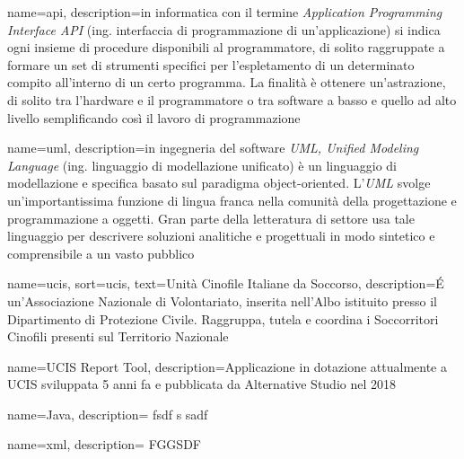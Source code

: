 \makeglossaries
\renewcommand{\acronymname}{Acronimi e abbreviazioni}

\renewcommand{\glossaryname}{Glossario}

{
    name=api,
    description={in informatica con il termine \emph{Application Programming Interface API} (ing. interfaccia di programmazione di un'applicazione) si indica ogni insieme di procedure disponibili al programmatore, di solito raggruppate a formare un set di strumenti specifici per l'espletamento di un determinato compito all'interno di un certo programma. La finalità è ottenere un'astrazione, di solito tra l'hardware e il programmatore o tra software a basso e quello ad alto livello semplificando così il lavoro di programmazione}
}

{
    name=uml,
    description={in ingegneria del software \emph{UML, Unified Modeling Language} (ing. linguaggio di modellazione unificato) è un linguaggio di modellazione e specifica basato sul paradigma object-oriented. L'\emph{UML} svolge un'importantissima funzione di lingua franca nella comunità della progettazione e programmazione a oggetti. Gran parte della letteratura di settore usa tale linguaggio per descrivere soluzioni analitiche e progettuali in modo sintetico e comprensibile a un vasto pubblico}
}

{
    name=ucis,
    sort=ucis,
    text=Unità Cinofile Italiane da Soccorso,
    description={É un'Associazione Nazionale di Volontariato, inserita nell'Albo istituito presso il Dipartimento di Protezione Civile. Raggruppa, tutela e coordina i Soccorritori Cinofili presenti sul Territorio Nazionale}
}

{
  name=UCIS Report Tool,
  description={Applicazione in dotazione attualmente a UCIS sviluppata 5 anni fa e pubblicata da Alternative Studio nel 2018}
}

{
  name=Java,
  description={ fsdf s sadf }
}

{
  name=xml,
  description={ FGGSDF }
}
